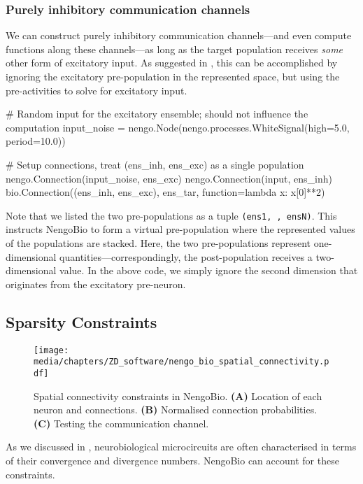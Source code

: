 \subsubsection{Purely inhibitory communication channels}
We can construct purely inhibitory communication channels---and even compute functions along these channels---as long as the target population receives \emph{some} other form of excitatory input.
As suggested in , this can be accomplished by ignoring the excitatory pre-population in the represented space, but using the pre-activities to solve for excitatory input.
\begin{pythoncode}
# Random input for the excitatory ensemble; should not influence the computation
input_noise = nengo.Node(nengo.processes.WhiteSignal(high=5.0, period=10.0))

# Setup connections, treat (ens_inh, ens_exc) as a single population
nengo.Connection(input_noise, ens_exc)
nengo.Connection(input, ens_inh)
bio.Connection((ens_inh, ens_exc), ens_tar, function=lambda x: x[0]**2)
\end{pythoncode}
Note that we listed the two pre-populations as a tuple \texttt{(ens1, \textellipsis, ensN)}.
This instructs NengoBio to form a virtual pre-population where the represented values of the populations are stacked.
Here, the two pre-populations represent one-dimensional quantities---correspondingly, the post-population receives a two-dimensional value.
In the above code, we simply ignore the second dimension that originates from the excitatory pre-neuron.

\subsection{Sparsity Constraints}
\label{sec:nengo_bio_sparsity}

\begin{figure}
	\centering
	\texttt{[image: media/chapters/ZD\_software/nengo\_bio\_spatial\_connectivity.pdf]}
	\caption[Spatial connectivity constraints in NengoBio]{
		Spatial connectivity constraints in NengoBio.
		\textbf{(A)} Location of each neuron and connections.
		\textbf{(B)} Normalised connection probabilities.
		\textbf{(C)} Testing the communication channel.
	}
	\label{fig:nengo_bio_spatial_connectivity}
\end{figure}

As we discussed in , neurobiological microcircuits are often characterised in terms of their convergence and divergence numbers.
NengoBio can account for these constraints.

